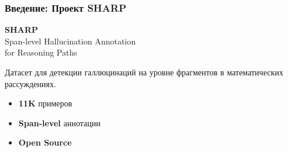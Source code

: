\documentclass{beamer}
\begin{document}
\begin{frame}
  \frametitle{Введение: Проект SHARP}
  \begin{center}
      \Huge \textbf{SHARP} \\[0.5em]
      \Large Span-level Hallucination Annotation \\ for Reasoning Paths
  \end{center}
  \vspace{1em}
  
  \large Датасет для детекции галлюцинаций на уровне фрагментов в математических рассуждениях.
  
  \vspace{1em}
  \normalsize
  \begin{itemize}
      \item \textbf{11K} примеров
      \item \textbf{Span-level} аннотации
      \item \textbf{Open Source}
  \end{itemize}
\end{frame}
\end{document}
